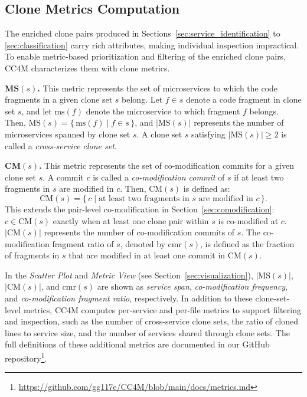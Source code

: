 \documentclass[conference]{IEEEtran}
\begin{document}
\subsection{Clone Metrics Computation}
\label{sec:clone_metrics}

The enriched clone pairs produced in Sections~\ref{sec:service_identification} to \ref{sec:classification} carry rich attributes, making individual inspection impractical.
To enable metric-based prioritization and filtering of the enriched clone pairs, \textsc{CC4M} characterizes them with clone metrics.
% 

\textbf{\(\mathbf{MS}(s)\). }
This metric represents the set of microservices to which the code fragments in a given clone set \(s\) belong.
Let \(f \in s\) denote a code fragment in clone set \(s\), and let \(\mathrm{ms}(f)\) denote the microservice to which fragment \(f\) belongs. Then, \(\mathrm{MS}(s) = \{\, \mathrm{ms}(f) \mid f \in s \,\}\), and \(|\mathrm{MS}(s)|\) represents the number of microservices spanned by clone set \(s\).
A clone set \(s\) satisfying \(|\mathrm{MS}(s)| \geq 2\) is called a \emph{cross-service clone set}.

\textbf{\(\mathbf{CM}(s)\).}
This metric represents the set of co-modification commits for a given clone set \(s\).
A commit \(c\) is called a \emph{co-modification commit} of \(s\) if at least two fragments in \(s\) are modified in \(c\).
Then, \(\mathrm{CM}(s)\) is defined as:
\[
\mathrm{CM}(s) = \{\, c \mid \text{at least two fragments in } s \text{ are modified in } c \,\}.
\]
This extends the pair-level co-modification in Section~\ref{sec:comodification}: \(c \in \mathrm{CM}(s)\) exactly when at least one clone pair within \(s\) is co-modified at \(c\).
\(|\mathrm{CM}(s)|\) represents the number of co-modification commits of \(s\).
The co-modification fragment ratio of \(s\), denoted by \(\mathrm{cmr}(s)\), is defined as the fraction of fragments in \(s\) that are modified in at least one commit in \(\mathrm{CM}(s)\).

In the \emph{Scatter Plot} and \emph{Metric View} (see Section~\ref{sec:visualization}), \(|\mathrm{MS}(s)|\), \(|\mathrm{CM}(s)|\), and \(\mathrm{cmr}(s)\) are shown as \textit{service span}, \textit{co-modification frequency}, and \textit{co-modification fragment ratio}, respectively.
In addition to these clone-set-level metrics, \textsc{CC4M} computes per-service and per-file metrics to support filtering and inspection, such as the number of cross-service clone sets, the ratio of cloned lines to service size, and the number of services shared through clone sets.
The full definitions of these additional metrics are documented in our GitHub repository\footnote{\url{https://github.com/gg117e/CC4M/blob/main/docs/metrics.md}}.
\end{document}
